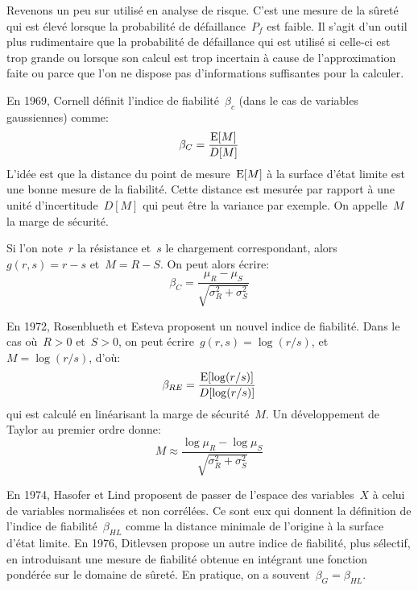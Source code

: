 \begin{histoire}
\medskip\ifVersionDuDocEstVincent\else\vspace{\medskipamount}\fi
Revenons un peu sur  utilisé en analyse de risque. C'est une mesure de la sûreté qui est élevé lorsque la probabilité de défaillance~$P_f$ est faible. Il s'agit d'un outil plus rudimentaire que la probabilité de défaillance qui est utilisé si celle-ci est trop grande ou lorsque son calcul est trop incertain à cause de l'approximation faite ou parce que l'on ne dispose pas d'informations suffisantes pour la calculer.

En 1969, Cornell définit l'indice de fiabilité~$\beta_c$ (dans le cas de variables gaussiennes) comme:
\begin{equation}
\beta_C=\dfrac{\operatorname{E}[M]}{D[M]}
\end{equation}
L'idée est que la distance du point de mesure~$\operatorname{E}[M]$ à la surface d'état limite est une bonne mesure de la fiabilité. Cette distance est mesurée par rapport à une unité d'incertitude~$D[M]$ qui peut être la variance par exemple. On appelle~$M$ la marge de sécurité.

Si l'on note~$r$ la résistance et~$s$ le chargement correspondant, alors~$g(r,s)=r-s$ et~$M=R-S$. On peut alors écrire:
$$\beta_C=\dfrac{\mu_R-\mu_S}{\sqrt{\sigma_R^2+\sigma_S^2}}$$

En 1972, Rosenblueth et Esteva proposent un nouvel indice de fiabilité. Dans le cas où~$R>0$ et~$S>0$, on peut écrire~$g(r,s)=\log(r/s)$, et~$M=\log(r/s)$, d'où:
\begin{equation}
\beta_{RE}=\dfrac{\operatorname{E}[\log(r/s)]}{D[\log(r/s)]}
\end{equation}
qui est calculé en linéarisant la marge de sécurité~$M$. Un développement de Taylor au premier ordre donne:
$$M\approx\dfrac{\log\mu_R-\log\mu_S}{\sqrt{\sigma_R^2+\sigma_S^2}}$$

En 1974, Hasofer et Lind proposent de passer de l'espace des variables~$X$ à celui de variables normalisées et non corrélées. Ce sont eux qui donnent la définition de l'indice de fiabilité~$\beta_{HL}$ comme la distance minimale de l'origine à la surface d'état limite.
En 1976, Ditlevsen propose un autre indice de fiabilité, plus sélectif, en introduisant une mesure de fiabilité obtenue en intégrant une fonction pondérée sur le domaine de sûreté. En pratique, on a souvent~$\beta_G=\beta_{HL}$.
\end{histoire}

